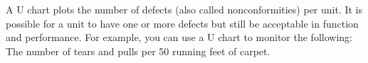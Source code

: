 A U chart plots the number of defects (also called nonconformities) per unit. It is possible for a unit to have one or more defects but still be acceptable in function and performance. For example, you can use a U chart to monitor the following: The number of tears and pulls per 50 running feet of carpet.
